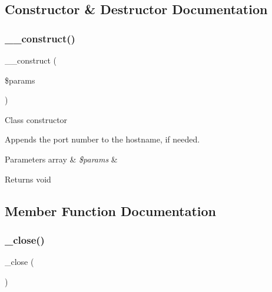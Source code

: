 \subsection{Constructor \& Destructor Documentation}
\mbox{\label{class_c_i___d_b__mssql__driver_a9162320adff1a1a4afd7f2372f753a3e}} 
\subsubsection{\texorpdfstring{\+\_\+\+\_\+construct()}{\_\_construct()}}
{\footnotesize\ttfamily \+\_\+\+\_\+construct (\begin{DoxyParamCaption}\item[{}]{\$params }\end{DoxyParamCaption})}

Class constructor

Appends the port number to the hostname, if needed.


\begin{DoxyParams}[1]{Parameters}
array & {\em \$params} & \\
\hline
\end{DoxyParams}
\begin{DoxyReturn}{Returns}
void 
\end{DoxyReturn}


\subsection{Member Function Documentation}
\mbox{\label{class_c_i___d_b__mssql__driver_a4d9082658000e5ede8312067c6dda9db}} 
\subsubsection{\texorpdfstring{\+\_\+close()}{\_close()}}
{\footnotesize\ttfamily \+\_\+close (\begin{DoxyParamCaption}{ }\end{DoxyParamCaption})\hspace{0.3cm}{\ttfamily [protected]}}

